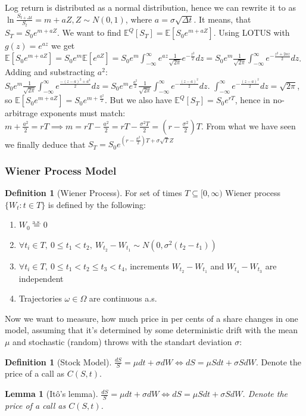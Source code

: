 \documentclass[11pt,a4paper]{article}
\theoremstyle{plain}
\newtheorem{lemma}[theorem]{Lemma}
\theoremstyle{definition}
\newtheorem{definition}[theorem]{Definition}
\theoremstyle{remark}
\newcommand{\1}{\mathbf{1}}
\newcommand{\aseq}{\overset{\text{a.s.}}{=}}
\begin{document}
Log return is distributed as a normal distribution, hence we can rewrite it to as $\ln\frac{S_{t+\Delta t}}{S_t}=m+aZ,Z\sim N(0,1)$,
where $a=\sigma\sqrt{\Delta t}$. It means, that $S_T=S_0e^{m+aZ}$. We want to find $\mathbb{E}^Q[S_T]=\mathbb{E}[S_0e^{m+aZ}]$.
Using LOTUS with $g(z)=e^{az}$ we get $\mathbb{E}[S_0e^{m+aZ}]=S_0e^m\mathbb{E}[e^{aZ}]=S_0e^m\displaystyle\int_{-\infty}^{\infty}e^{az}\frac{1}{\sqrt{2\pi}}e^{-\frac{z^2}{2}}dz=S_0e^m\frac{1}{\sqrt{2\pi}}\displaystyle\int_{-\infty}^{\infty}e^{-\frac{z^2+2az}{2}}dz$.
Adding and substracting $a^2$: $S_0e^m\frac{1}{\sqrt{2\pi}}\displaystyle\int_{-\infty}^{\infty}e^{\frac{-(z-a)^2+a^2}{2}}dz=S_0e^me^{\frac{a^2}{2}}\frac{1}{\sqrt{2\pi}}\displaystyle\int_{-\infty}^{\infty}e^{-\frac{(z-a)^2}{2}}dz$.
$\displaystyle\int_{-\infty}^{\infty}e^{-\frac{(z-a)^2}{2}}dz=\sqrt{2\pi}$, so $\mathbb{E}[S_0e^{m+aZ}]=S_0e^{m+\frac{a^2}{2}}$. But we also have $\mathbb{E}^Q[S_T]=S_0e^{rT}$,
hence in no-arbitrage exponents must match: $m+\frac{a^2}{2}=rT\implies m=rT-\frac{a^2}{2}=rT-\frac{\sigma^2T}{2}=(r-\frac{\sigma^2}{2})T$.
From what we have seen we finally deduce that $S_T=S_0e^{(r-\frac{\sigma^2}{2})T+\sigma\sqrt{T}Z}$

\subsubsection{Wiener Process Model}

\begin{definition}[Wiener Process]
  For set of times $T\subseteq [0,\infty)$ Wiener process $\{W_t:t\in T\}$ is defined by the following:
  \begin{enumerate}
    \item $W_0\aseq0$
    \item $\forall t_i\in T,\ 0\le t_1<t_2,\ W_{t_2}-W_{t_1}\sim N(0,\sigma^2(t_2-t_1))$
    \item $\forall t_i\in T,\ 0\le t_1<t_2\le t_3<t_4$, increments $W_{t_2}-W_{t_1}$ and $W_{t_4}-W_{t_3}$ are independent
    \item Trajectories $\omega\in\Omega$ are continuous a.s.
  \end{enumerate}
\end{definition}

Now we want to measure, how much price in per cents of a share changes in one model, assuming that it's determined by some deterministic drift with the mean $\mu$ and
stochastic (random) throws with the standart deviation $\sigma$:

\begin{definition}[Stock Model]
  $\frac{dS}{S}=\mu dt+\sigma dW\iff dS=\mu Sdt+\sigma SdW$. Denote the price of a call as $C(S,t)$.
\end{definition}

\begin{lemma}[Itô’s lemma]
  $\frac{dS}{S}=\mu dt+\sigma dW\iff dS=\mu Sdt+\sigma SdW$. Denote the price of a call as $C(S,t)$.
\end{lemma}
\end{document}
